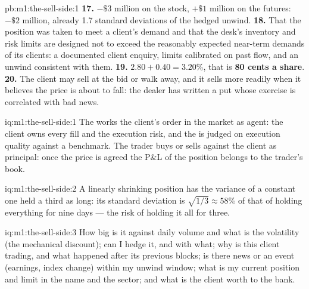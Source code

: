 \begin{solution}{pb:m1:the-sell-side:1}
\textbf{17.} $-\$3$ million on the stock, $+\$1$ million on the futures:
$-\$2$ million, already 1.7 standard deviations of the hedged unwind.
\textbf{18.} That the position was taken to meet a client's demand and that
the desk's inventory and risk limits are designed not to exceed the
reasonably expected near-term demands of its clients: a documented client
enquiry, limits calibrated on past flow, and an unwind consistent with them.
\textbf{19.} $2.80 + 0.40 = 3.20\%$, that is \textbf{80 cents a share}.
\textbf{20.} The client may sell at the bid or walk away, and it sells more
readily when it believes the price is about to fall: the dealer has written
a put whose exercise is correlated with bad news.
\end{solution}

\begin{solution}{iq:m1:the-sell-side:1}
The  works the client's order in the market as agent: the
client owns every fill and the execution risk, and the  is
judged on execution quality against a benchmark. The trader buys or sells
against the client as principal: once the price is agreed the P\&L of the
position belongs to the trader's book.
\end{solution}

\begin{solution}{iq:m1:the-sell-side:2}
A linearly shrinking position has the variance of a constant one held a
third as long: its standard deviation is $\sqrt{1/3} \approx 58\%$ of that of
holding everything for nine days --- the risk of holding it all for three.
\end{solution}

\begin{solution}{iq:m1:the-sell-side:3}
How big is it against daily volume and what is the volatility (the
mechanical discount); can I hedge it, and with what; why is this client
trading, and what happened after its previous blocks; is there news or an
event (earnings, index change) within my unwind window; what is my current
position and limit in the name and the sector; and what is the client worth
to the bank.
\end{solution}

